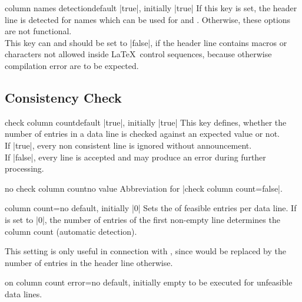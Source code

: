 \documentclass[a4paper,11pt]{ltxdoc}
\begin{document}
\begin{docCsvKey}[][doc new=2022-02-01]{column names detection}{}{default |true|, initially |true|}
  If this key is set, the header line is detected for names which can be used
  for  and .
  Otherwise, these options are not functional.\\
  This key can and should be set to |false|, if the header line contains
  macros or characters not allowed inside \LaTeX\ control sequences, because
  otherwise compilation error are to be expected.
\end{docCsvKey}


\clearpage
\subsection{Consistency Check}\label{sec:consistency}%

\begin{docCsvKey}{check column count}{}{default |true|, initially |true|}
  This key defines, whether the number of entries in a data line is checked against
  an expected value or not.\\
  If |true|, every non consistent line is ignored without announcement.\\
  If |false|, every line is accepted and may produce an error during
  further processing.
\end{docCsvKey}


\begin{docCsvKey}{no check column count}{}{no value}
  Abbreviation for |check column count=false|.
\end{docCsvKey}


\begin{docCsvKey}[][doc updated=2021-06-24]{column count}{=}{no default, initially |0|}
  Sets the  of feasible entries per data line.
  If  is set to |0|, the number of entries of
  the first non-empty line determines the column count (automatic detection).

  This setting is only useful in connection with ,
  since  would be replaced by the number of entries in the
  header line otherwise.
\end{docCsvKey}


\begin{docCsvKey}{on column count error}{=}{no default, initially empty}
   to be executed for unfeasible data lines.
\end{docCsvKey}
\end{document}
